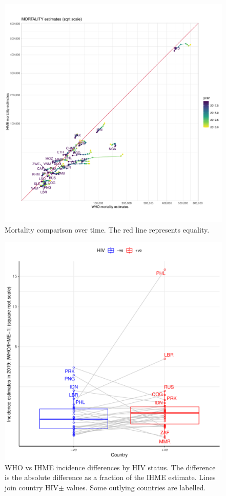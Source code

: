\documentclass[12pt]{article}
\begin{document}
\FloatBarrier

\begin{figure}
  \centering
  \includegraphics[width=1\textwidth]{../plots/aF2b.pdf}
  \caption[Mortality comparison over time]{Mortality comparison over time. The
    red line represents equality.}
\end{figure}

\FloatBarrier

\begin{figure}
  \centering
  \includegraphics[width=1\textwidth]{../plots/aF9.pdf}
  \caption[WHO vs IHME incidence differences by HIV status]{WHO vs IHME
    incidence differences by HIV status. The difference is the absolute
    difference as a fraction of the IHME estimate. Lines join country HIV$\pm$
    values. Some outlying countries are labelled.}
\end{figure}
\end{document}
